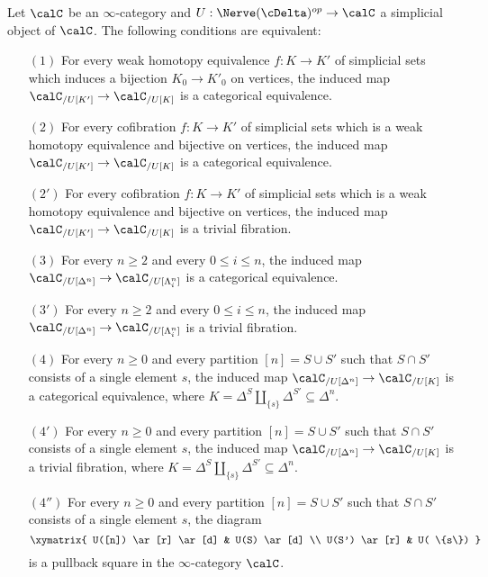 \begin{proposition}\label{grpobjdef}
Let $\calC$ be an $\infty$-category and $U: \Nerve(\cDelta)^{op} \rightarrow \calC$ a simplicial
object of $\calC$. The following conditions are equivalent:
\begin{itemize}

\item[$(1)$] For every weak homotopy equivalence $f: K \rightarrow K'$ of simplicial
sets which induces a bijection $K_0 \rightarrow K'_0$ on vertices, the induced map
$\calC_{/U[K']} \rightarrow \calC_{/U[K]}$ is a categorical equivalence.

\item[$(2)$] For every cofibration $f: K \rightarrow K'$ of simplicial sets which is a weak homotopy equivalence and bijective on vertices, the induced map
$\calC_{/U[K']} \rightarrow \calC_{/U[K]}$ is a categorical equivalence.

\item[$(2')$] For every cofibration $f: K \rightarrow K'$ of simplicial sets which is a weak homotopy equivalence and bijective on vertices, the induced map
$\calC_{/U[K']} \rightarrow \calC_{/U[K]}$ is a trivial fibration.

\item[$(3)$] For every $n \geq 2$ and every $0 \leq i \leq n$, the induced map
$\calC_{/U[\Delta^n]} \rightarrow \calC_{/U[\Lambda^n_i]}$ is a categorical equivalence.

\item[$(3')$] For every $n \geq 2$ and every $0 \leq i \leq n$, the induced map
$\calC_{/U[\Delta^n]} \rightarrow \calC_{/U[\Lambda^n_i]}$ is a trivial fibration.

\item[$(4)$] For every $n \geq 0$ and every partition $[n] = S \cup S'$ such that
$S \cap S'$ consists of a single element $s$, the induced map
$\calC_{/U[\Delta^n]} \rightarrow \calC_{ /U[K]}$
is a categorical equivalence, where $K = \Delta^{S} \amalg_{ \{s\} } \Delta^{ S'} \subseteq \Delta^n$.

\item[$(4')$] For every $n \geq 0$ and every partition $[n] = S \cup S'$ such that
$S \cap S'$ consists of a single element $s$, the induced map
$\calC_{/U[\Delta^n]} \rightarrow \calC_{ /U[K]}$
is a trivial fibration, where $K = \Delta^{S} \amalg_{ \{s\} } \Delta^{ S'} \subseteq \Delta^n$.

\item[$(4'')$] For every $n \geq 0$ and every partition $[n] = S \cup S'$ such that
$S \cap S'$ consists of a single element $s$, the diagram
$$ \xymatrix{ U([n]) \ar[r] \ar[d] & U(S) \ar[d] \\
U(S') \ar[r] & U( \{s\}) }$$
is a pullback square in the $\infty$-category $\calC$.
\end{itemize}
\end{proposition}

